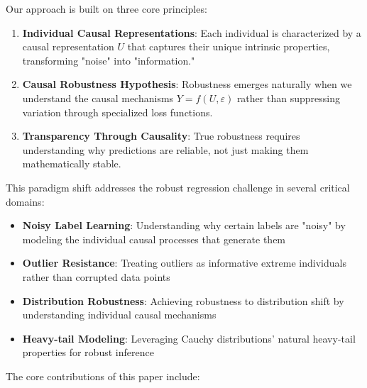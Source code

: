 \documentclass[conference]{IEEEtran}
\begin{document}
Our approach is built on three core principles:

\begin{enumerate}
\item \textbf{Individual Causal Representations}: Each individual is characterized by a causal representation $U$ that captures their unique intrinsic properties, transforming "noise" into "information."

\item \textbf{Causal Robustness Hypothesis}: Robustness emerges naturally when we understand the causal mechanisms $Y = f(U, \varepsilon)$ rather than suppressing variation through specialized loss functions.

\item \textbf{Transparency Through Causality}: True robustness requires understanding why predictions are reliable, not just making them mathematically stable.
\end{enumerate}

This paradigm shift addresses the robust regression challenge in several critical domains:

\begin{itemize}
\item \textbf{Noisy Label Learning}: Understanding why certain labels are "noisy" by modeling the individual causal processes that generate them
\item \textbf{Outlier Resistance}: Treating outliers as informative extreme individuals rather than corrupted data points
\item \textbf{Distribution Robustness}: Achieving robustness to distribution shift by understanding individual causal mechanisms
\item \textbf{Heavy-tail Modeling}: Leveraging Cauchy distributions' natural heavy-tail properties for robust inference
\end{itemize}

The core contributions of this paper include:
\end{document}
